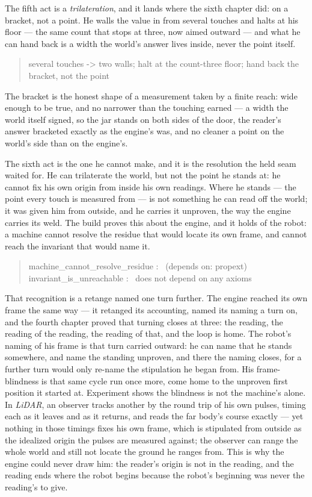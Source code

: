 The fifth act is a \emph{trilateration}, and it lands where the sixth chapter did: on a bracket, not a point.
He walls the value in from several touches and halts at his floor --- the same count that stops at three, now aimed
outward --- and what he can hand back is a width the world's answer lives inside, never the point itself.
\begin{quote}\ttfamily
several touches -> two walls; halt at the count-three floor; hand back the bracket, not the point
\end{quote}
The bracket is the honest shape of a measurement taken by a finite reach: wide enough to be true, and no narrower than
the touching earned --- a width the world itself signed, so the jar stands on both sides of the door, the reader's answer
bracketed exactly as the engine's was, and no cleaner a point on the world's side than on the engine's.

The sixth act is the one he cannot make, and it is the resolution the held seam waited for.
He can trilaterate the world, but not the point he stands at: he cannot fix his own origin from inside his own readings.
Where he stands --- the point every touch is measured from --- is not something he can read off the world; it was given
him from outside, and he carries it unproven, the way the engine carries its weld.
The build proves this about the engine, and it holds of the robot: a machine cannot resolve the residue that would locate
its own frame, and cannot reach the invariant that would name it.
\begin{quote}\ttfamily
machine\_cannot\_resolve\_residue : \ (depends on: propext)\\
invariant\_is\_unreachable : \ does not depend on any axioms
\end{quote}
That recognition is a retange named one turn further.
The engine reached its own frame the same way --- it retanged its accounting, named its naming a turn on, and the fourth
chapter proved that turning closes at three: the reading, the reading of the reading, the reading of that, and the loop
is home.
The robot's naming of his frame is that turn carried outward: he can name that he stands somewhere, and name the standing
unproven, and there the naming closes, for a further turn would only re-name the stipulation he began from.
His frame-blindness is that same cycle run once more, come home to the unproven first position it started at.
Experiment shows the blindness is not the machine's alone.
In \emph{LiDAR}, an observer tracks another by the round trip of his own pulses, timing each as it leaves and as it
returns, and reads the far body's course exactly --- yet nothing in those timings fixes his own frame, which is
stipulated from outside as the idealized origin the pulses are measured against; the observer can range the whole world
and still not locate the ground he ranges from.
This is why the engine could never draw him: the reader's origin is not in the reading, and the reading ends where the
robot begins because the robot's beginning was never the reading's to give.

